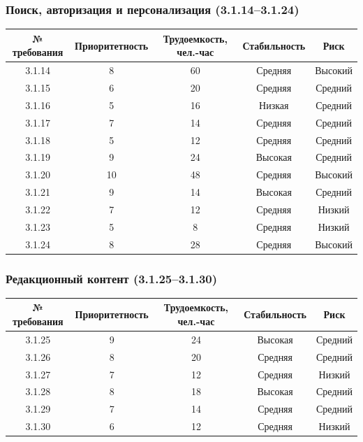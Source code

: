 \subsubsection*{Поиск, авторизация и персонализация (3.1.14--3.1.24)}
\begin{center}
\renewcommand{\arraystretch}{1.4}
\begin{tabular}{|c|c|c|c|c|}
\hline
№ требования & Приоритетность & Трудоемкость, чел.-час & Стабильность & Риск \\ \hline
3.1.14 & 8 & 60 & Средняя & Высокий \\ \hline
3.1.15 & 6 & 20 & Средняя & Средний \\ \hline
3.1.16 & 5 & 16 & Низкая & Средний \\ \hline
3.1.17 & 7 & 14 & Средняя & Средний \\ \hline
3.1.18 & 5 & 12 & Средняя & Средний \\ \hline
3.1.19 & 9 & 24 & Высокая & Средний \\ \hline
3.1.20 & 10 & 48 & Средняя & Высокий \\ \hline
3.1.21 & 9 & 14 & Высокая & Средний \\ \hline
3.1.22 & 7 & 12 & Средняя & Низкий \\ \hline
3.1.23 & 5 & 8 & Средняя & Низкий \\ \hline
3.1.24 & 8 & 28 & Средняя & Высокий \\ \hline
\end{tabular}
\renewcommand{\arraystretch}{1}
\end{center}

\subsubsection*{Редакционный контент (3.1.25--3.1.30)}
\begin{center}
\renewcommand{\arraystretch}{1.4}
\begin{tabular}{|c|c|c|c|c|}
\hline
№ требования & Приоритетность & Трудоемкость, чел.-час & Стабильность & Риск \\ \hline
3.1.25 & 9 & 24 & Высокая & Средний \\ \hline
3.1.26 & 8 & 20 & Средняя & Средний \\ \hline
3.1.27 & 7 & 12 & Средняя & Низкий \\ \hline
3.1.28 & 8 & 18 & Высокая & Средний \\ \hline
3.1.29 & 7 & 14 & Средняя & Средний \\ \hline
3.1.30 & 6 & 12 & Средняя & Низкий \\ \hline
\end{tabular}
\renewcommand{\arraystretch}{1}
\end{center}

